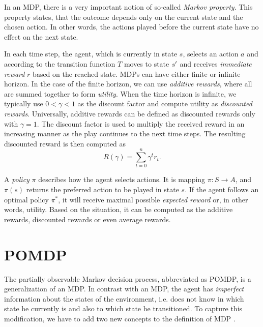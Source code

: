 \documentclass[../main.tex]{subfiles}
\begin{document}
In an MDP, there is a very important notion of so-called \textit{Markov property}\label{bg:mdp:markprop}.
This property states, that the outcome depends only on the current state and the chosen action.
In other words, the actions played before the current state have no effect on the next state.

In each time step, the agent, which is currently in state $s$, selects an action $a$ and according to the transition function $T$ moves to state $s^{\prime}$ and receives \textit{immediate reward} $r$ based on the reached state.
MDPs can have either finite or infinite horizon.
In the case of the finite horizon, we can use \textit{additive rewards}, where all are summed together to form \textit{utility}.
When the time horizon is infinite, we typically use $0 < \gamma < 1$ as the discount factor and compute utility as \textit{discounted rewards}.
Universally, additive rewards can be defined as discounted rewards only with $\gamma = 1$.
The discount factor is used to multiply the received reward in an increasing manner as the play continues to the next time steps.
The resulting discounted reward is then computed as
\begin{equation}\label{bg:mpd:disc}
    R(\gamma) = \sum_{t = 0}^{n}\gamma^t r_t.
\end{equation}

A \textit{policy} $\pi$ describes how the agent selects actions.
It is mapping $\pi: S \to A$, and $\pi(s)$ returns the preferred action to be played in state $s$.
If the agent follows an optimal policy $\pi^*$, it will receive maximal possible \textit{expected reward} or, in other words, utility.
Based on the situation, it can be computed as the additive rewards, discounted rewards or even average rewards.

\section{POMDP}\label{bg:pomdp}
The partially observable Markov decision process, abbreviated as POMDP, is a generalization of an MDP.
In contrast with an MDP, the agent has \textit{imperfect} information about the states of the environment, i.e. does not know in which state he currently is and also to which state he transitioned.
To capture this modification, we have to add two new concepts to the definition of MDP .
\end{document}
